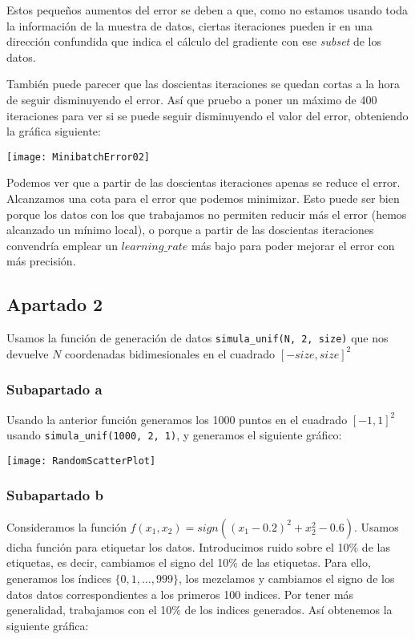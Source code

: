 \documentclass[11pt]{article}
\begin{document}
Estos pequeños aumentos del error se deben a que, como no estamos usando toda la información de la muestra de datos, ciertas iteraciones pueden ir en una dirección confundida que indica el cálculo del gradiente con ese \emph{subset} de los datos.

También puede parecer que las doscientas iteraciones se quedan cortas a la hora de seguir disminuyendo el error. Así que pruebo a poner un máximo de 400 iteraciones para ver si se puede seguir disminuyendo el valor del error, obteniendo la gráfica siguiente:

\texttt{[image: MinibatchError02]}

Podemos ver que a partir de las doscientas iteraciones apenas se reduce el error. Alcanzamos una cota para el error que podemos minimizar. Esto puede ser bien porque los datos con los que trabajamos no permiten reducir más el error (hemos alcanzado un mínimo local), o porque a partir de las doscientas iteraciones convendría emplear un $learning\_rate$ más bajo para poder mejorar el error con más precisión.

\pagebreak

\subsection{Apartado 2}

Usamos la función de generación de datos \lstinline{simula_unif(N, 2, size)} que nos devuelve $N$ coordenadas bidimesionales en el cuadrado $[-size, size]^2$

\subsubsection{Subapartado a}

Usando la anterior función generamos los 1000 puntos en el cuadrado $[-1, 1]^2$ usando \lstinline{simula_unif(1000, 2, 1)}, y generamos el siguiente gráfico:

\texttt{[image: RandomScatterPlot]}

\subsubsection{Subapartado b}

Consideramos la función $f(x_1, x_2) = sign((x_1 - 0.2)^2 + x_2^2 - 0.6)$. Usamos dicha función para etiquetar los datos. Introducimos ruido sobre el 10\% de las etiquetas, es decir, cambiamos el signo del 10\% de las etiquetas. Para ello, generamos los índices $\{0, 1, \ldots, 999\}$, los mezclamos y cambiamos el signo de los datos datos correspondientes a los primeros 100 indices. Por tener más generalidad, trabajamos con el 10\% de los indices generados. Así obtenemos la siguiente gráfica:
\end{document}
